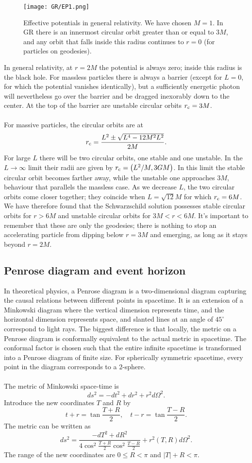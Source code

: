 \begin{figure}
\centering
\texttt{[image: GR/EP1.png]}
\caption{Effective potentials in general relativity. We have chosen $M = 1$. In GR there is an innermost circular orbit greater than or equal to $3M$, and any orbit that falls inside this radius continues to $r = 0$ (for particles on geodesies).}
\end{figure}

\noindent
In general relativity, at $r = 2M$ the potential is always zero; inside this radius is the black hole.
For massless particles there is always a barrier (except for $L = 0$, for which the potential vanishes identically), but a sufficiently energetic photon will  nevertheless go over the barrier and be dragged inexorably down to the center. At the top of the barrier are unstable circular orbits $r_{\rm c} = 3M$.
\\ \\
For massive particles, the circular orbits are at
\[r_{\rm c} = \frac{L^2 \pm \sqrt{L^4-12M^2L^2}}{2M}.\]
For large $L$ there will be two circular orbits, one stable and one unstable. In the $L \to \infty$ limit their radii are given by $r_{\rm c} = \left(L^2/M, 3GM \right)$.
In this limit the stable circular orbit becomes farther away, while the unstable one approaches $3M$, behaviour that parallels the massless case. As we decrease $L$,
the two circular orbits come closer together; they coincide when $L = \sqrt{12}M$ for which $r_{\rm c} = 6M$. We have therefore found that the Schwarzschild solution possesses stable circular orbits for $r > 6M$ and unstable circular orbits for $3M < r < 6M$. 
It's important to remember that these are only the geodesies; there is nothing to stop an accelerating particle from dipping below $r = 3M$ and emerging, as long as it stays beyond $r = 2M$.

\subsection{Penrose diagram and event horizon}
In theoretical physics, a Penrose diagram is a two-dimensional diagram capturing the causal relations between different points in spacetime. 
It is an extension of a Minkowski diagram where the vertical dimension represents time, and the horizontal dimension represents space, and slanted lines at an angle of $45^{\circ}$ correspond to light rays. 
The biggest difference is that locally, the metric on a Penrose diagram is conformally equivalent to the actual metric in spacetime. 
The conformal factor is chosen such that the entire infinite spacetime is transformed into a Penrose diagram of finite size. 
For spherically symmetric spacetime, every point in the diagram corresponds to a $2$-sphere.
\\ \\
The metric of Minkowski space-time is 
\[ds^2 = -dt^2 + dr^2 + r^2 d\Omega^2.\]
Introduce the new coordinates $T$ and $R$ by 
\[t + r = \tan \frac{T+R}{2} ,\quad t - r = \tan \frac{T-R}{2}.\]
The metric can be written as
\[ds^2 = \frac{-dT^2+dR^2}{4\cos^2\frac{T+R}{2} \cos^2 \frac{T-R}{2}} + r^2(T,R) d\Omega^2.\]
The range of the new coordinates are $0 \leq R < \pi$ and  $|T| + R < \pi$.

